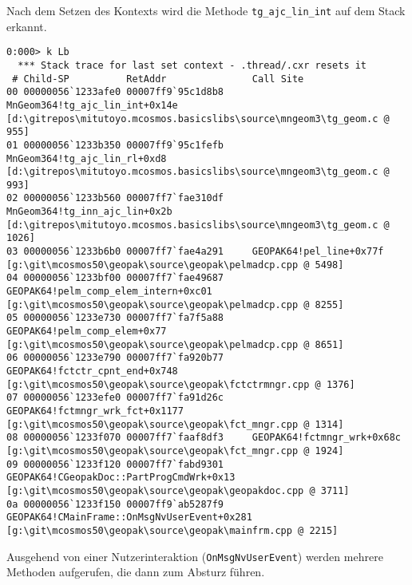 Nach dem Setzen des Kontexts wird die Methode \verb|tg_ajc_lin_int| auf dem Stack erkannt.

\begin{lstlisting}
0:000> k Lb
  *** Stack trace for last set context - .thread/.cxr resets it
 # Child-SP          RetAddr               Call Site
00 00000056`1233afe0 00007ff9`95c1d8b8     MnGeom364!tg_ajc_lin_int+0x14e [d:\gitrepos\mitutoyo.mcosmos.basicslibs\source\mngeom3\tg_geom.c @ 955] 
01 00000056`1233b350 00007ff9`95c1fefb     MnGeom364!tg_ajc_lin_rl+0xd8 [d:\gitrepos\mitutoyo.mcosmos.basicslibs\source\mngeom3\tg_geom.c @ 993] 
02 00000056`1233b560 00007ff7`fae310df     MnGeom364!tg_inn_ajc_lin+0x2b [d:\gitrepos\mitutoyo.mcosmos.basicslibs\source\mngeom3\tg_geom.c @ 1026] 
03 00000056`1233b6b0 00007ff7`fae4a291     GEOPAK64!pel_line+0x77f [g:\git\mcosmos50\geopak\source\geopak\pelmadcp.cpp @ 5498] 
04 00000056`1233bf00 00007ff7`fae49687     GEOPAK64!pelm_comp_elem_intern+0xc01 [g:\git\mcosmos50\geopak\source\geopak\pelmadcp.cpp @ 8255] 
05 00000056`1233e730 00007ff7`fa7f5a88     GEOPAK64!pelm_comp_elem+0x77 [g:\git\mcosmos50\geopak\source\geopak\pelmadcp.cpp @ 8651] 
06 00000056`1233e790 00007ff7`fa920b77     GEOPAK64!fctctr_cpnt_end+0x748 [g:\git\mcosmos50\geopak\source\geopak\fctctrmngr.cpp @ 1376] 
07 00000056`1233efe0 00007ff7`fa91d26c     GEOPAK64!fctmngr_wrk_fct+0x1177 [g:\git\mcosmos50\geopak\source\geopak\fct_mngr.cpp @ 1314] 
08 00000056`1233f070 00007ff7`faaf8df3     GEOPAK64!fctmngr_wrk+0x68c [g:\git\mcosmos50\geopak\source\geopak\fct_mngr.cpp @ 1924] 
09 00000056`1233f120 00007ff7`fabd9301     GEOPAK64!CGeopakDoc::PartProgCmdWrk+0x13 [g:\git\mcosmos50\geopak\source\geopak\geopakdoc.cpp @ 3711] 
0a 00000056`1233f150 00007ff9`ab5287f9     GEOPAK64!CMainFrame::OnMsgNvUserEvent+0x281 [g:\git\mcosmos50\geopak\source\geopak\mainfrm.cpp @ 2215] 
\end{lstlisting}

Ausgehend von einer Nutzerinteraktion (\verb|OnMsgNvUserEvent|) werden mehrere Methoden aufgerufen, die dann zum Absturz führen.

